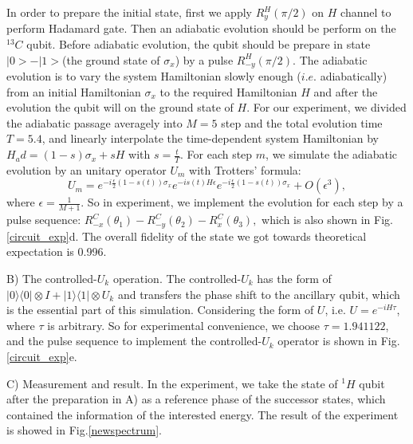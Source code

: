 \def\CTeXPreproc{Created by ctex v0.2.12, don't edit!}\documentclass[twocolumn,showpacs,twoside,10pt,superscriptaddress,prl]{revtex4}
\begin{document}
In order to prepare the initial state, first we apply $R_{y}^{H}
(\pi/2)$ on $H$ channel to perform Hadamard gate. Then an adiabatic
evolution should be perform on the $^{13}C$ qubit. Before adiabatic
evolution, the qubit should be prepare in state $|0>-|1>$(the ground
state of $\sigma_x$) by a pulse $R_{-y}^{H} (\pi/2)$. The adiabatic
evolution is to vary the system Hamiltonian slowly enough ($i.e.$
adiabatically) from an initial Hamiltonian $\sigma_x$ to the
required Hamiltonian $H$ and after the evolution the qubit will on
the ground state of $H$. For our experiment, we divided the
adiabatic passage averagely into $M=5$ step and the total evolution
time $T=5.4$, and linearly interpolate the time-dependent system
Hamiltonian by $H_ad=(1-s)\sigma_x + sH$ with $s=\frac{t}{T}$. For
each step $m$, we simulate the adiabatic evolution by an unitary
operator $U_m$ with Trotters' formula:
\begin{equation}
U_{m}=e^{-i\frac{\epsilon}{2}(1-s(t))\sigma_{x}}e^{-is(t)H\epsilon}
e^{-i\frac{\epsilon}{2}(1-s(t))\sigma_{x} }+O(\epsilon^{3}),
\end{equation}
where $\epsilon = \frac{1}{M+1}$. So in experiment, we implement the
evolution for each step by a pulse sequence:
$R_{-x}^{C}(\theta_{1})-R_{-y}^{C}(\theta_{2})-R_{x}^{C}(\theta_{3}),$
which is also shown in Fig.\ref{circuit_exp}d. The overall fidelity
of the state we got towards theoretical expectation is 0.996.







B) The controlled-$U_k$ operation. The controlled-$U_k$ has the form
of $|0\rangle\langle0|\otimes I +|1\rangle\langle1|\otimes U_k $ and
transfers the phase shift to the ancillary qubit, which is the
essential part of this simulation. Considering the form of $U$, i.e.
$U= e^{-iH\tau}$, where $\tau$ is arbitrary. So for experimental
convenience, we choose $\tau=1.941122$, and the pulse sequence to
implement the controlled-$U_k$ operator is shown in
Fig.\ref{circuit_exp}e.



C) Measurement and result.  In the experiment, we take the state of
$^1H$ qubit after the preparation in A) as a reference phase of the
successor states, which contained the information of the interested
energy. The result of the experiment is showed in
Fig.\ref{newspectrum}.
\end{document}
